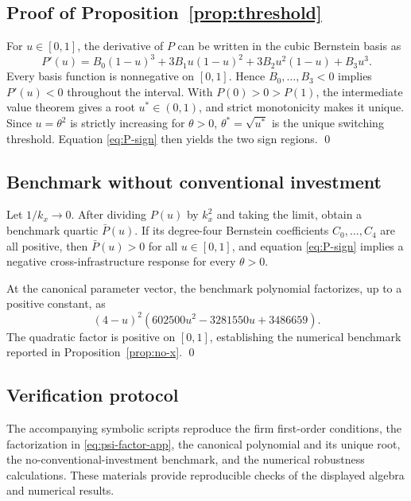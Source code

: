 \subsection{Proof of Proposition~\ref{prop:threshold}}

For $u\in[0,1]$, the derivative of $P$ can be written in the cubic Bernstein basis as
\[
P'(u)
=B_0(1-u)^3+3B_1u(1-u)^2+3B_2u^2(1-u)+B_3u^3.
\]
Every basis function is nonnegative on $[0,1]$. Hence $B_0,\ldots,B_3<0$ implies $P'(u)<0$ throughout the interval. With $P(0)>0>P(1)$, the intermediate value theorem gives a root $u^*\in(0,1)$, and strict monotonicity makes it unique. Since $u=\theta^2$ is strictly increasing for $\theta>0$, $\theta^*=\sqrt{u^*}$ is the unique switching threshold. Equation \eqref{eq:P-sign} then yields the two sign regions. \qed

\subsection{Benchmark without conventional investment}

Let $1/k_x\rightarrow0$. After dividing $P(u)$ by $k_x^2$ and taking the limit, obtain a benchmark quartic $\bar P(u)$. If its degree-four Bernstein coefficients $C_0,\ldots,C_4$ are all positive, then $\bar P(u)>0$ for all $u\in[0,1]$, and equation \eqref{eq:P-sign} implies a negative cross-infrastructure response for every $\theta>0$.

At the canonical parameter vector, the benchmark polynomial factorizes, up to a positive constant, as
\[
(4-u)^2\left(602500u^2-3281550u+3486659\right).
\]
The quadratic factor is positive on $[0,1]$, establishing the numerical benchmark reported in Proposition~\ref{prop:no-x}. \qed

\subsection{Verification protocol}

The accompanying symbolic scripts reproduce the firm first-order conditions, the factorization in \eqref{eq:psi-factor-app}, the canonical polynomial and its unique root, the no-conventional-investment benchmark, and the numerical robustness calculations. These materials provide reproducible checks of the displayed algebra and numerical results.